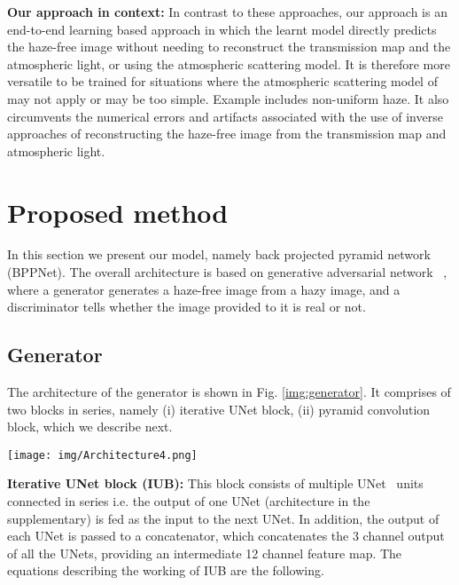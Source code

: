 \documentclass[runningheads]{llncs}
\begin{document}
\textbf{Our approach in context: }In contrast to these approaches, our approach is an end-to-end learning based approach in which the learnt model directly predicts the haze-free image without needing to reconstruct the transmission map and the atmospheric light, or using the atmospheric scattering model. It is therefore more versatile to be trained for situations where the atmospheric scattering model of \cite{koschmieder1925theorie} may not apply or may be too simple. Example includes non-uniform haze. It also circumvents the numerical errors and artifacts associated with the use of inverse approaches of reconstructing the haze-free image from the transmission map and atmospheric light. 


\section{Proposed method}\label{sec:proposed}

In this section we present our model, namely back projected pyramid network (BPPNet). The overall architecture is based on generative adversarial network ~\cite{goodfellow2014generative}, where a generator generates a haze-free image from a hazy image, and a discriminator tells whether the image provided to it is real or not. 

\subsection{Generator} The architecture of the generator is shown in Fig. \ref{img:generator}. It comprises of two blocks in series, namely (i) iterative UNet block, (ii) pyramid convolution block, which we describe next.

\begin{figure*}[t]
\texttt{[image: img/Architecture4.png]}
\caption{The architecture of our generator.}
\label{img:generator}
\end{figure*}


{\textbf{Iterative UNet block (IUB):}} This block consists of multiple UNet~\cite{ronneberger2015u} units connected in series i.e. the output of one UNet (architecture in the supplementary) is fed as the input to the next UNet. In addition, the output of each UNet is passed to a concatenator, which concatenates the 3 channel output of all the UNets, providing an intermediate 12 channel feature map. The equations describing the working of IUB are the following.
\end{document}
